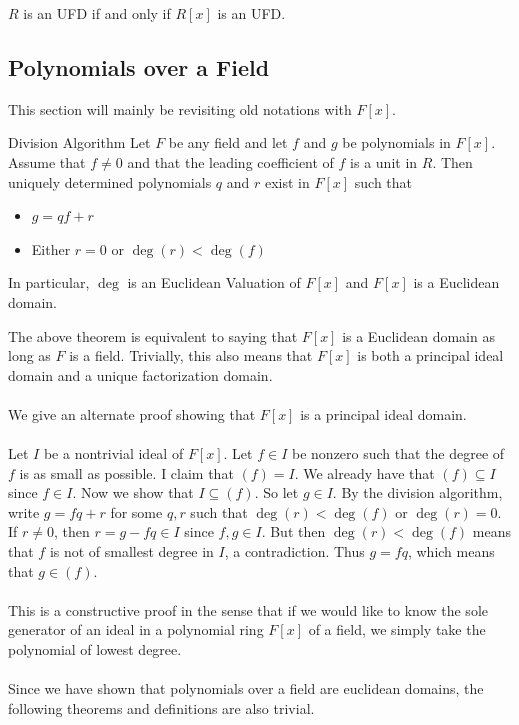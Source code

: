 \documentclass[a4paper]{article}
\begin{document}
\begin{prp}{}{} $R$ is an UFD if and only if $R[x]$ is an UFD. 
\end{prp}

\subsection{Polynomials over a Field}
This section will mainly be revisiting old notations with $F[x]$. 
\begin{thm}{Division Algorithm}{} Let $F$ be any field and let $f$ and $g$ be polynomials in $F[x]$. Assume that $f\neq0$ and that the leading coefficient of $f$ is a unit in $R$. Then uniquely determined polynomials $q$ and $r$ exist in $F[x]$ such that 
\begin{itemize}
\item $g=qf+r$
\item Either $r=0$ or $\deg(r)<\deg(f)$
\end{itemize}
In particular, $\deg$ is an Euclidean Valuation of $F[x]$ and $F[x]$ is a Euclidean domain. 
\end{thm}

The above theorem is equivalent to saying that $F[x]$ is a Euclidean domain as long as $F$ is a field. Trivially, this also means that $F[x]$ is both a principal ideal domain and a unique factorization domain. \\~\\
We give an alternate proof showing that $F[x]$ is a principal ideal domain. \\~\\
Let $I$ be a nontrivial ideal of $F[x]$. Let $f\in I$ be nonzero such that the degree of $f$ is as small as possible. I claim that $(f)=I$. We already have that $(f)\subseteq I$ since $f\in I$. Now we show that $I\subseteq(f)$. So let $g\in I$. By the division algorithm, write $g=fq+r$ for some $q,r$ such that $\deg(r)<\deg(f)$ or $\deg(r)=0$. If $r\neq 0$, then $r=g-fq\in I$ since $f,g\in I$. But then $\deg(r)<\deg(f)$ means that $f$ is not of smallest degree in $I$, a contradiction. Thus $g=fq$, which means that $g\in(f)$. \\~\\
This is a constructive proof in the sense that if we would like to know the sole generator of an ideal in a polynomial ring $F[x]$ of a field, we simply take the polynomial of lowest degree. \\~\\

Since we have shown that polynomials over a field are euclidean domains, the following theorems and definitions are also trivial. 
\end{document}
